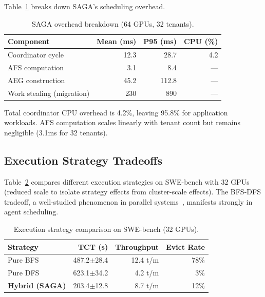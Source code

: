 \documentclass[sigconf]{acmart}
\newcommand{\sysname}{SAGA\xspace}
\begin{document}
Table~\ref{tab:overhead} breaks down \sysname's scheduling overhead.

\begin{table}[t]
    \centering
    \caption{\sysname overhead breakdown (64 GPUs, 32 tenants).}
    \label{tab:overhead}
    \begin{tabular}{lrrr}
    \toprule
    \textbf{Component} & \textbf{Mean (ms)} & \textbf{P95 (ms)} & \textbf{CPU (\%)} \\
    \midrule
    Coordinator cycle & 12.3 & 28.7 & 4.2 \\
    AFS computation & 3.1 & 8.4 & --- \\
    AEG construction & 45.2 & 112.8 & --- \\
    Work stealing (migration) & 230 & 890 & --- \\
    \bottomrule
    \end{tabular}
\end{table}

Total coordinator CPU overhead is 4.2\%, leaving 95.8\% for application workloads. AFS computation scales linearly with tenant count but remains negligible (3.1ms for 32 tenants).

\subsection{Execution Strategy Tradeoffs}
\label{sec:tradeoff}

Table~\ref{tab:bfsdfs} compares different execution strategies on SWE-bench with 32 GPUs (reduced scale to isolate strategy effects from cluster-scale effects). The BFS-DFS tradeoff, a well-studied phenomenon in parallel systems~\cite{graefe1990volcano}, manifests strongly in agent scheduling.

\begin{table}[t]
    \centering
    \caption{Execution strategy comparison on SWE-bench (32 GPUs).}
    \label{tab:bfsdfs}
    \begin{tabular}{lrrr}
    \toprule
    \textbf{Strategy} & \textbf{TCT (s)} & \textbf{Throughput} & \textbf{Evict Rate} \\
    \midrule
    Pure BFS & 487.2\scriptsize{$\pm$28.4} & 12.4 t/m & 78\% \\
    Pure DFS & 623.1\scriptsize{$\pm$34.2} & 4.2 t/m & 3\% \\
    \textbf{Hybrid (\sysname)} & 203.4\scriptsize{$\pm$12.8} & 8.7 t/m & 12\% \\
    \bottomrule
    \end{tabular}
\end{table}
\end{document}
